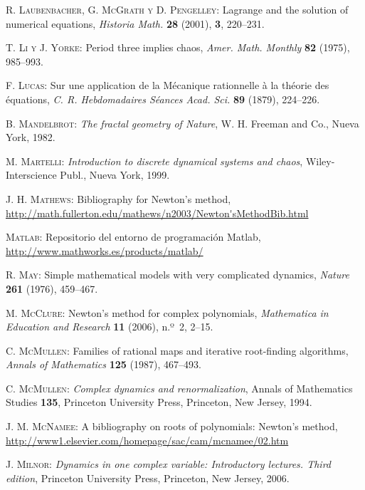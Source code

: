 \begin{thebibliography}{999}
\textsc{R. Laubenbacher, G. McGrath y D.  Pengelley}:
 Lagrange and the solution of numerical equations,
\textit{Historia Math.} \textbf{28} (2001),  \textbf{3}, 220--231.

\textsc{T. Li y J. Yorke}:
Period three implies chaos,
\textit{Amer. Math. Monthly} \textbf{82}
(1975), 985--993.

\textsc{F. Lucas}:
Sur une application de la Mécanique rationnelle à la théorie des équations,
\textit{C. R. Hebdomadaires Séances Acad. Sci.} \textbf{89}
(1879), 224--226.

\textsc{B. Mandelbrot}:
\textit{The fractal geometry of Nature}, W. H. Freeman and Co., Nueva York, 1982.

\textsc{M. Martelli}:
\textit{Introduction to discrete dynamical systems and chaos},
Wiley-Interscience Publ., Nueva York,
1999.

\textsc{J. H. Mathews}:
Bibliography for Newton's method,
\url{http://math.fullerton.edu/mathews/n2003/Newton'sMethodBib.html}

\textsc{Matlab}:
Repositorio del entorno de programación Matlab,
\url{http://www.mathworks.es/products/matlab/}

 \textsc{R. May}:
   Simple mathematical models with very
complicated dynamics,
\textit{Nature} \textbf{261} (1976), 459--467.

\textsc{M. McClure}: 
{Newton's method for complex polynomials},
\textit{Mathematica in Education and Research} \textbf{11} (2006), n.º~2, 2--15.

\textsc{C. McMullen}:
 Families of rational maps and iterative root-finding algorithms,
\textit{Annals of Mathematics} \textbf{125} (1987), 467--493.

\textsc{C. McMullen}:
\textit{Complex dynamics and renormalization},
Annals of Mathematics Studies \textbf{135}, Princeton University Press, Princeton, New Jersey, 1994.

\textsc{J. M. McNamee}:
A bibliography on roots of polynomials: Newton's method,
\url{http://www1.elsevier.com/homepage/sac/cam/mcnamee/02.htm}

 \textsc{J. Milnor}:
\textit{Dynamics in one complex variable: Introductory lectures. Third edition},
Princeton University Press, Princeton, New Jersey, 2006.



\end{thebibliography}
